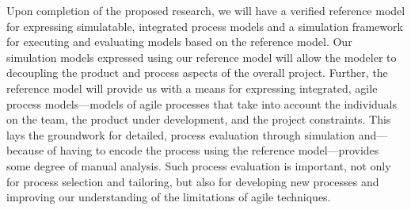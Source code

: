 Upon completion of the proposed research, we will have a verified reference
model for expressing simulatable, integrated process models and a
simulation framework for executing and evaluating models based on the reference
model.  Our simulation models expressed using our reference model will allow the
modeler to decoupling the product and process aspects of the overall
project.
Further, the reference model will provide us with a means for expressing
integrated, agile process models---models of agile processes that take into account the
individuals on the team, the product under development, and the project
constraints.  This lays the groundwork for detailed, \apriori process evaluation
through simulation and---because of having to encode the process using the
reference model---provides some degree of manual analysis.  Such process
evaluation is important, not only for \apriori process selection and tailoring,
but also for developing new processes and improving our understanding of the
limitations of agile techniques.
